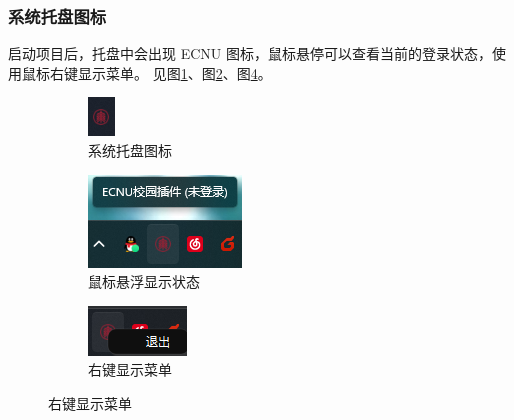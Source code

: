 \subsubsection{系统托盘图标}

启动项目后，托盘中会出现 ECNU 图标，鼠标悬停可以查看当前的登录状态，使用鼠标右键显示菜单。
见图\ref{fig:tray-icon}、图\ref{fig:tray-icon-hover}、图\ref{fig:tray-icon-menu}。

\begin{figure}
    \centering
    \begin{subfigure}[b]{0.3\textwidth}
        \centering
        \includegraphics{img/tray_icon}
        \caption{系统托盘图标}
        \label{fig:tray-icon}
    \end{subfigure}
    \hspace{0.06\textwidth}
    \begin{subfigure}[b]{0.3\textwidth}
        \centering
        \includegraphics{img/tray_icon_hover}
        \caption{鼠标悬浮显示状态}
        \label{fig:tray-icon-hover}
    \end{subfigure}
    \begin{subfigure}[b]{0.3\textwidth}
        \centering
        \includegraphics{img/tray_icon_menu}
        \caption{右键显示菜单}
        \label{fig:tray-icon-menu}
    \end{subfigure}
\end{figure}

